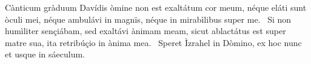 { Cànticum gràduum Davídis}
{%
òmine non est exaltátum cor meum, néque eláti sunt òculi mei, néque ambulávi in magnïs, néque in mirabìlibus super me. 
~Si non humìliter sençiábam, sed exaltávi ànimam meam, sicut ablactátus est super matre sua, ita retribúçio in ànima mea. 
~Speret Ìzrahel in Dòmino, ex hoc nunc et usque in sáeculum. 
}

